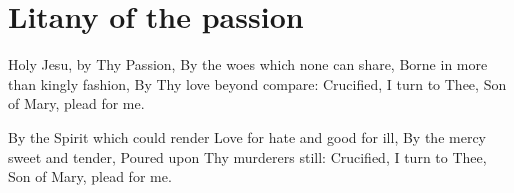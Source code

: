 \starttocol
\chapter{Litany of the passion}
\nexttocol
\hfill{\it }
\stoptocol
\starttocol
\startlines
{\sc Holy} Jesu, by Thy Passion,
By the woes which none can share,
Borne in more than kingly fashion,
By Thy love beyond compare:
Crucified, I turn to Thee,
Son of Mary, plead for me.

By the Spirit which could render
Love for hate and good for ill,
By the mercy sweet and tender,
Poured upon Thy murderers still:
Crucified, I turn to Thee,
Son of Mary, plead for me.
\stoplines
\nexttocol

\stoptocol
